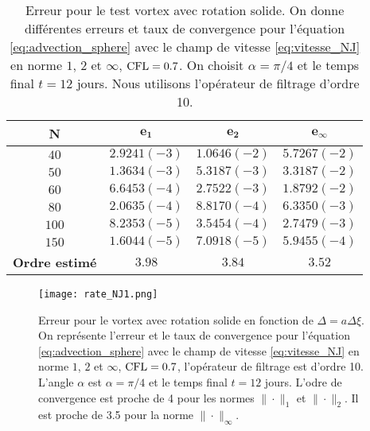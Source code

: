 \begin{table}[htbp]
\begin{center}
\begin{tabular}{|c||c|c|c|}
\hline
\textbf{N}  & $\mathbf{e_1}$ & $\mathbf{e_2}$ & $\mathbf{e_{\infty}}$\\
\hline
\hline
$40$  & $2.9241 (-3)$ & $1.0646 (-2)$ & $5.7267 (-2)$ \\
$50$  & $1.3634 (-3)$ & $5.3187 (-3)$ & $3.3187 (-2)$ \\
$60$  & $6.6453 (-4)$ & $2.7522 (-3)$ & $1.8792 (-2)$ \\
$80$  & $2.0635 (-4)$ & $8.8170 (-4)$ & $6.3350 (-3)$ \\
$100$ & $8.2353 (-5)$ & $3.5454 (-4)$ & $2.7479 (-3)$ \\
$150$ & $1.6044 (-5)$ & $7.0918 (-5)$ & $5.9455 (-4)$ \\
\hline 
\hline
\textbf{Ordre estimé}& $3.98$ & $3.84$ & $3.52$\\
\hline
\end{tabular}
\end{center}
\caption{Erreur pour le test vortex avec rotation solide. On donne différentes erreurs et taux de convergence pour l'équation \eqref{eq:advection_sphere} avec le champ de vitesse \eqref{eq:vitesse_NJ} en norme $1$, $2$ et $\infty$, $\text{CFL} = 0.7$. On choisit $\alpha = \pi/4$ et le temps final $t=12$ jours. Nous utilisons l'opérateur de filtrage d'ordre 10.}
\label{tab:rate1_NJ}
\end{table} 

\begin{figure}[htbp]
\begin{center}
\texttt{[image: rate\_NJ1.png]}
\end{center}
\caption{Erreur pour le vortex avec rotation solide en fonction de $\Delta = a \Delta \xi$. On représente l'erreur et le taux de convergence pour l'équation \eqref{eq:advection_sphere} avec le champ de vitesse \eqref{eq:vitesse_NJ} en norme $1$, $2$ et $\infty$, $\text{CFL} = 0.7$, l'opérateur de filtrage est d'ordre 10. L'angle $\alpha$ est $\alpha = \pi/4$ et le temps final $t=12$ jours. L'odre de convergence est proche de 4 pour les normes $\| \cdot \|_1$ et $\| \cdot \|_2$. Il est proche de 3.5 pour la norme $\| \cdot \|_{\infty}$.}
\label{fig:rate1_NJ}
\end{figure} 


